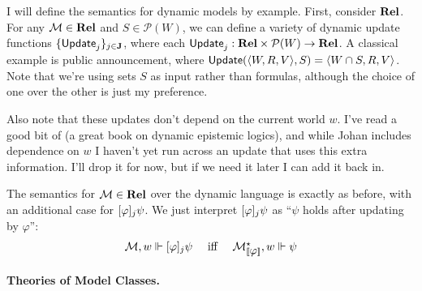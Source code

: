 \documentclass[letterpaper]{article}
\begin{document}
I will define the semantics for dynamic models by example.  First, consider $\textrm{\textbf{Rel}}$.  For any $\mathcal{M} \in \textrm{\textbf{Rel}}$ and $S \in \mathcal{P}(W)$, we can define a variety of dynamic update functions $\{ \mathsf{Update}_j \}_{j \in \textbf{J}}$, where each $\mathsf{Update}_j : \textrm{\textbf{Rel}} \times \mathcal{P}(W) \to \textrm{\textbf{Rel}}$.  A classical example is public announcement, where $\mathsf{Update}(\langle W, R, V \rangle, S) = \langle W \cap S, R, V \rangle$.  Note that we're using sets $S$ as input rather than formulas, although the choice of one over the other is just my preference.

Also note that these updates don't depend on the current world $w$.  I've read a good bit of \cite{van2011logicaldynamics} (a great book on dynamic epistemic logics), and while Johan includes dependence on $w$ I haven't yet run across an update that uses this extra information.  I'll drop it for now, but if we need it later I can add it back in.

The semantics for $\mathcal{M} \in \textrm{\textbf{Rel}}$ over the dynamic language is exactly as before, with an additional case for $[\varphi]_j \psi$.  We just interpret $[\varphi]_j \psi$ as ``$\psi$ holds after updating by $\varphi$'':
\[
\begin{array}{lcl}
    \mathcal{M}, w \Vdash [\varphi]_j \psi & \mbox{ iff } & \mathcal{M}^\star_{[\![\mbox{\em $ \varphi $\/}]\!]}, w \Vdash \psi
\end{array}
\]






\paragraph*{Theories of Model Classes.} 
\end{document}
